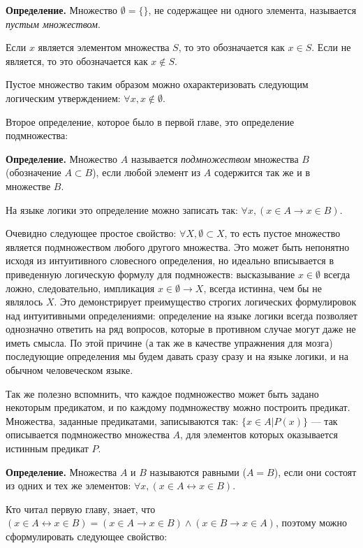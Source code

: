 {\bfseries Определение.} Множество $\emptyset=\{\}$, не содержащее ни одного элемента, называется {\slshape пустым множеством}.

Если $x$ является элементом множества $S$, то это обозначается как $x \in S$. Если не является, то это обозначается как $x \not\in S$.

Пустое множество таким образом можно охарактеризовать следующим логическим утверждением: $\forall x, x \not \in \emptyset$.

Второе определение, которое было в первой главе, это определение подмножества:

{\bfseries Определение.} Множество $A$ называется {\slshape подмножеством} множества $B$ (обозначение $A\subset B$), если любой элемент из $A$ содержится так же и в множестве $B$.

На языке логики это определение можно записать так: $\forall x, (x\in A\rightarrow x\in B)$.

Очевидно следующее простое свойство: $\forall X, \emptyset\subset X$, то есть пустое множество является подмножеством любого другого множества. Это может быть непонятно исходя из интуитивного словесного определения, но идеально вписывается в приведенную логическую формулу для подмножеств: высказывание $x\in\emptyset$ всегда ложно, следовательно, импликация $x\in\emptyset \rightarrow X$, всегда истинна, чем бы не являлось $X$. Это демонстрирует преимущество строгих логических формулировок над интуитивными определениями: определение на языке логики всегда позволяет однозначно ответить на ряд вопросов, которые в противном случае могут даже не иметь смысла. По этой причине (а так же в качестве упражнения для мозга) последующие определения мы будем давать сразу сразу и на языке логики, и на обычном человеческом языке.

Так же полезно вспомнить, что каждое подмножество может быть задано некоторым предикатом, и по каждому подмножеству можно построить предикат. Множества, заданные предикатами, записываются так: $\{x \in A|P(x)\}$ — так описывается подмножество множества $A$, для элементов которых оказывается истинным предикат $P$.

{\bfseries Определение.} Множества $A$ и $B$ называются равными ($A=B$), если они состоят из одних и тех же элементов: $\forall x, (x\in A \leftrightarrow x\in B)$.

Кто читал первую главу, знает, что $(x\in A \leftrightarrow x\in B) = (x \in A \rightarrow x \in B) \wedge (x \in B \rightarrow x \in A)$, поэтому можно сформулировать следующее свойство:

